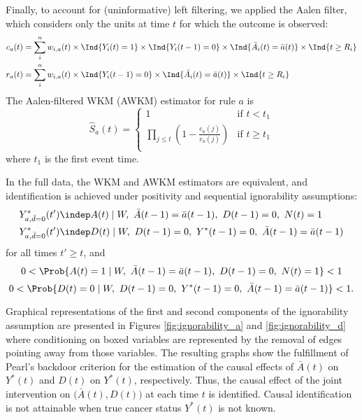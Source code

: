\documentclass[
  11pt,
]{article}
\begin{document}
Finally, to account for (uninformative) left filtering, we applied the
Aalen filter, which considers only the units at time \(t\) for which the
outcome is observed: \[\begin{aligned}
c_{a} (t)
& = \sum_i^n w_{i, a}(t) \times \Ind{Y_i(t) = 1} \times \Ind{Y_i(t - 1) = 0} \times \Ind{\bar A_i (t) = \bar a(t)} \times \Ind{t \ge R_i} \\
r_{a} (t)
& = \sum_i^n w_{i, a}(t) \times \Ind{Y_i(t - 1) = 0} \times \Ind{\bar A_i (t) = \bar a(t)} \times \Ind{t \ge R_i}
\end{aligned}\] The Aalen-filtered WKM (AWKM) estimator for rule \(a\)
is \[\hat S_{a}(t) =
\begin{cases}
1 & \text{if } t < t_1 \\
\prod_{j \le t} \left(1 - \frac{c_{a}(j)}{r_{a}(j)}\right) & \text{if } t \ge t_1 \\
\end{cases}\] where \(t_1\) is the first event time.

In the full data, the WKM and AWKM estimators are equivalent, and
identification is achieved under positivity and sequential ignorability
assumptions: \[\begin{aligned}
Y^*_{a, \bar d = 0} (t')   & \indep A(t) \mid W,\ \bar A(t - 1) = \bar a(t - 1),\ D(t - 1) = 0,\ N(t) = 1\\
Y^*_{a, \bar d = 0} (t') & \indep D(t) \mid W,\ D(t - 1) = 0,\ Y^*(t - 1) = 0,\ \bar A(t - 1) = \bar a(t - 1)
\end{aligned}\] for all times \(t'\ge t\), and
\[0 < \Prob{ A(t) = 1 \mid W,\ \bar A(t - 1) = \bar a(t - 1),\ D(t - 1) = 0,\ N(t) = 1} < 1\]
\[0 < \Prob{D(t) = 0 \mid W,\ D(t - 1) = 0,\ Y^*(t - 1) = 0,\ \bar A(t - 1) = \bar a(t - 1)} < 1.\]

Graphical representations of the first and second components of the
ignorability assumption are presented in Figures
\ref{fig:ignorability_a} and \ref{fig:ignorability_d} where conditioning
on boxed variables are represented by the removal of edges pointing away
from those variables. The resulting graphs show the fulfillment of
Pearl's backdoor criterion for the estimation of the causal effects of
\(\bar A(t)\) on \(Y^*(t)\) and \(D(t)\) on \(Y^*(t)\), respectively.
Thus, the causal effect of the joint intervention on
\(\big(\bar A(t), D(t)\big)\) at each time \(t\) is identified. Causal
identification is not attainable when true cancer status \(Y^*(t)\) is
not known.
\end{document}
